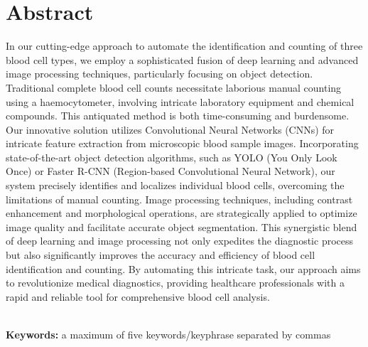 \chapter*{\center \Large  Abstract}

In our cutting-edge approach to automate the identification and counting of three blood cell types, we employ a sophisticated fusion of deep learning and advanced image processing techniques, particularly focusing on object detection. Traditional complete blood cell counts necessitate laborious manual counting using a haemocytometer, involving intricate laboratory equipment and chemical compounds. This antiquated method is both time-consuming and burdensome. Our innovative solution utilizes Convolutional Neural Networks (CNNs) for intricate feature extraction from microscopic blood sample images. Incorporating state-of-the-art object detection algorithms, such as YOLO (You Only Look Once) or Faster R-CNN (Region-based Convolutional Neural Network), our system precisely identifies and localizes individual blood cells, overcoming the limitations of manual counting. Image processing techniques, including contrast enhancement and morphological operations, are strategically applied to optimize image quality and facilitate accurate object segmentation. This synergistic blend of deep learning and image processing not only expedites the diagnostic process but also significantly improves the accuracy and efficiency of blood cell identification and counting. By automating this intricate task, our approach aims to revolutionize medical diagnostics, providing healthcare professionals with a rapid and reliable tool for comprehensive blood cell analysis.

~\\[1cm]
\noindent %
\textbf{Keywords:} a maximum of five keywords/keyphrase separated by commas

\vfill
\noindent


